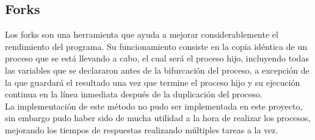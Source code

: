 \documentclass[journal]{IEEEtran}
\begin{document}
\subsection{Forks}
Los forks son una herramienta que ayuda a mejorar considerablemente el rendimiento del programa. Su funcionamiento consiste en la copia idéntica de un proceso que se está llevando a cabo, el cual será el proceso hijo, incluyendo todas las variables que se declararon antes de la bifurcación del proceso, a excepción de la que guardará el resultado una vez que termine el proceso hijo y su ejecución continua en la línea inmediata después de la duplicación del proceso.\\
La implementación de este método no pudo ser implementada en este proyecto, sin embargo pudo haber sido de mucha utilidad a la hora de realizar los procesos, mejorando los tiempos de respuestas realizando múltiples tareas a la vez.
\end{document}
